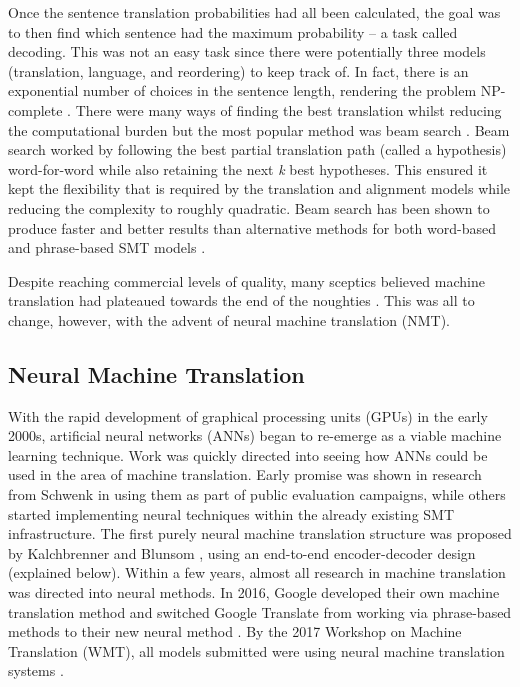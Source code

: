 \documentclass[11pt]{article}
\begin{document}
Once the sentence translation probabilities had all been calculated, the goal was to then find which sentence had the maximum probability -- a task called decoding. This was not an easy task since there were potentially three models (translation, language, and reordering) to keep track of. In fact, there is an exponential number of choices in the sentence length, rendering the problem NP-complete \citep{knight-1999-decoding}. There were many ways of finding the best translation whilst reducing the computational burden but the most popular method was beam search \citep[ch. 6]{koehn2010}. Beam search worked by following the best partial translation path (called a hypothesis) word-for-word while also retaining the next \textit{k} best hypotheses. This ensured it kept the flexibility that is required by the translation and alignment models while reducing the complexity to roughly quadratic. Beam search has been shown to produce faster and better results than alternative methods for both word-based and phrase-based SMT models \citep{koehn2004pharaoh, och2002statistical}.

\bigskip

Despite reaching commercial levels of quality, many sceptics believed machine translation had plateaued towards the end of the noughties \citep[p. 39]{koehn2020}. This was all to change, however, with the advent of neural machine translation (NMT). 

\subsection{Neural Machine Translation}

With the rapid development of graphical processing units (GPUs) in the early 2000s, artificial neural networks (ANNs) began to re-emerge as a viable machine learning technique. Work was quickly directed into seeing how ANNs could be used in the area of machine translation. Early promise was shown in research from Schwenk \citeyearpar{schwenk} in using them as part of public evaluation campaigns, while others started implementing neural techniques within the already existing SMT infrastructure. The first purely neural machine translation structure was proposed by Kalchbrenner and Blunsom \citeyearpar{kalchbrenner-blunsom-2013-recurrent-continuous}, using an end-to-end encoder-decoder design (explained below). Within a few years, almost all research in machine translation was directed into neural methods. In 2016, Google developed their own machine translation method \citep{wu2016googles} and switched Google Translate from working via phrase-based methods to their new neural method \citep{googleblog}. By the 2017 Workshop on Machine Translation (WMT), all models submitted were using neural machine translation systems \citep[p. 40]{koehn2020}.
\end{document}
